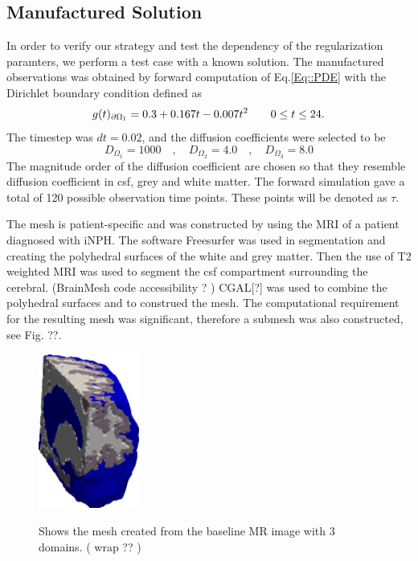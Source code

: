 \documentclass[11pt,a4paper]{article}
\begin{document}
\subsection*{Manufactured Solution}
In order to verify our strategy and test the dependency of the
regularization paramters, we perform a test case with a
known solution.  
The manufactured observations was obtained by forward computation of Eq.\ref{Eq::PDE} with the Dirichlet boundary condition defined as
\begin{equation}
g(t)_{\partial \Omega_1} = 0.3 +0.167t - 0.007t\sp{2} \qquad  0 \leq t \leq 24.
\label{EQ::DIRI}
\end{equation}
The timestep was $dt = 0.02$, and the diffusion coefficients were selected to be 
\begin{equation}
D_{\Omega_1} = 1000 \quad , \quad D_{\Omega_2} = 4.0 \quad , \quad D_{\Omega_3} = 8.0 
\end{equation}  
The magnitude order of the diffusion coefficient are chosen so that they resemble diffusion coefficient in csf, grey and white matter. The forward simulation gave a total of 120 possible observation time points. These points 
will be denoted as $\tau$.

The mesh is patient-specific and was constructed by using the MRI of a patient diagnosed with iNPH. The software Freesurfer was used in segmentation and creating the polyhedral surfaces of the white and grey matter. Then the use of T2 weighted MRI was used to segment the csf compartment surrounding the cerebral. (BrainMesh code accessibility ? ) CGAL[?] was used to combine the polyhedral surfaces and to construed the mesh. The computational requirement for the resulting mesh was significant, therefore a submesh was also constructed, see Fig. ??. 
\begin{figure}
\includegraphics[width=0.3\textwidth]{mesh-eps-converted-to.pdf} 
\label{figmesh} 
\caption{Shows the mesh created from the baseline MR image with 3 domains. ( wrap ?? ) }
\end{figure}
\end{document}
